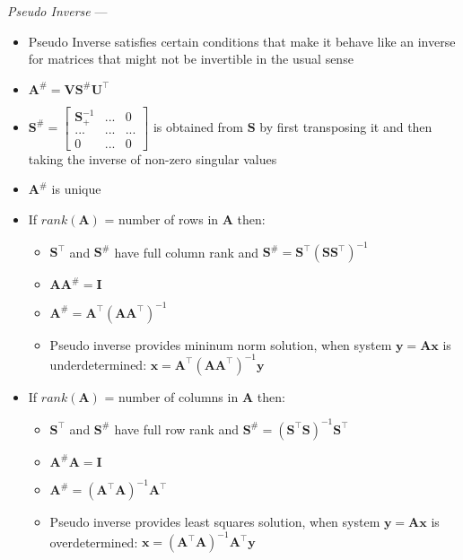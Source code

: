 \emph{Pseudo Inverse} --- 
\begin{itemize}
    \item Pseudo Inverse satisfies certain conditions that make it behave like an inverse for matrices that might not be invertible in the usual sense
    \item $\boldsymbol{A}^{\#} = \boldsymbol{V} \boldsymbol{S}^{\#} \boldsymbol{U}^\intercal$
    \item $ \boldsymbol{S}^{\#} = \begin{bmatrix}
        \boldsymbol{S}_+^{-1} & ... & 0 \\
        ... & ... & ... \\
        0 & ... & 0
        \end{bmatrix}$ is obtained from $ \boldsymbol{S}$ by first transposing it and then taking the inverse of non-zero singular values
    \item $\boldsymbol{A}^{\#}$ is unique
    \item If $rank(\boldsymbol{A})$ = number of rows in $\boldsymbol{A}$ then:
    \begin{itemize}
        \item $\boldsymbol{S}^\intercal$ and $\boldsymbol{S}^{\#}$ have full column rank and $\boldsymbol{S}^{\#} = \boldsymbol{S}^\intercal( \boldsymbol{S}\boldsymbol{S}^\intercal)^{-1} $
        \item $\boldsymbol{A}\boldsymbol{A}^{\#} = \boldsymbol{I}$
        \item $\boldsymbol{A}^{\#} = \boldsymbol{A}^\intercal (\boldsymbol{A}\boldsymbol{A}^\intercal)^{-1}$
        \item Pseudo inverse provides mininum norm solution, when system $\boldsymbol{y} = \boldsymbol{A}\boldsymbol{x}$ is underdetermined: $\boldsymbol{x} = \boldsymbol{A}^\intercal (\boldsymbol{A}\boldsymbol{A}^\intercal)^{-1} \boldsymbol{y}$
    \end{itemize}
    \item If $rank(\boldsymbol{A})$ = number of columns in $\boldsymbol{A}$ then:
    \begin{itemize}
        \item $\boldsymbol{S}^\intercal$ and $\boldsymbol{S}^{\#}$ have full row rank and $\boldsymbol{S}^{\#} = (\boldsymbol{S}^\intercal \boldsymbol{S})^{-1} \boldsymbol{S}^\intercal$
        \item $\boldsymbol{A}^{\#}\boldsymbol{A} = \boldsymbol{I}$
        \item $\boldsymbol{A}^{\#} =  (\boldsymbol{A}^\intercal\boldsymbol{A})^{-1} \boldsymbol{A}^\intercal$
        \item Pseudo inverse provides least squares solution, when system $\boldsymbol{y} = \boldsymbol{A}\boldsymbol{x}$ is overdetermined: $\boldsymbol{x} = (\boldsymbol{A}^\intercal\boldsymbol{A})^{-1} \boldsymbol{A}^\intercal\boldsymbol{y}$
    \end{itemize}
\end{itemize}

